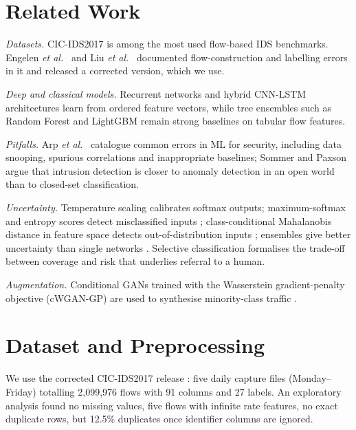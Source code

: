 \documentclass[conference]{IEEEtran}
\begin{document}
\section{Related Work}
\textit{Datasets.} CIC-IDS2017 \cite{sharafaldin2018toward} is among the most used flow-based IDS
benchmarks. Engelen \textit{et al.}\ \cite{engelen2021troubleshooting} and Liu \textit{et al.}\
\cite{liu2022error} documented flow-construction and labelling errors in it and released a
corrected version, which we use.

\textit{Deep and classical models.} Recurrent networks \cite{hochreiter1997lstm} and hybrid
CNN-LSTM architectures \cite{refpaper2025} learn from ordered feature vectors, while tree
ensembles such as Random Forest \cite{breiman2001random} and LightGBM \cite{ke2017lightgbm} remain
strong baselines on tabular flow features.

\textit{Pitfalls.} Arp \textit{et al.}\ \cite{arp2022dos} catalogue common errors in ML for
security, including data snooping, spurious correlations and inappropriate baselines; Sommer and
Paxson \cite{sommer2010outside} argue that intrusion detection is closer to anomaly detection in
an open world than to closed-set classification.

\textit{Uncertainty.} Temperature scaling \cite{guo2017calibration} calibrates softmax outputs;
maximum-softmax and entropy scores detect misclassified inputs \cite{hendrycks2017baseline};
class-conditional Mahalanobis distance in feature space detects out-of-distribution inputs
\cite{lee2018simple}; ensembles give better uncertainty than single networks
\cite{lakshminarayanan2017simple}. Selective classification \cite{geifman2017selective} formalises
the trade-off between coverage and risk that underlies referral to a human.

\textit{Augmentation.} Conditional GANs \cite{mirza2014conditional} trained with the Wasserstein
gradient-penalty objective \cite{gulrajani2017improved} (cWGAN-GP) are used to synthesise
minority-class traffic \cite{refpaper2025}.

\section{Dataset and Preprocessing}
We use the corrected CIC-IDS2017 release \cite{engelen2021troubleshooting,liu2022error}: five
daily capture files (Monday--Friday) totalling 2,099,976 flows with 91 columns and 27 labels.
An exploratory analysis found no missing values, five flows with infinite rate features, no exact
duplicate rows, but 12.5\% duplicates once identifier columns are ignored.
\end{document}
